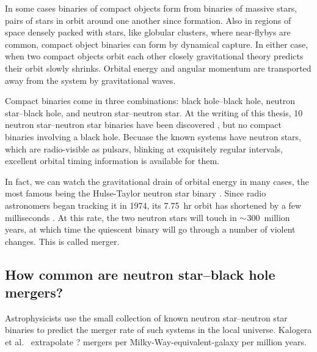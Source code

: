 In some cases binaries of compact objects form from binaries of massive stars,
pairs of stars in orbit around one another since formation. Also in regions of
space densely packed with stars, like globular clusters, where near-flybys are
common, compact object binaries can form by dynamical capture.
In either case, when two compact objects orbit each other closely gravitational
theory predicts their orbit slowly shrinks. Orbital energy and angular momentum
are transported away from the system by gravitational waves.

Compact binaries come in three combinations: black hole--black hole, neutron
star--black hole, and neutron star--neutron star. At the writing of this thesis,
10 neutron star--neutron star binaries have been discovered
\citep{post2014-evolution_compact_binaries},
but no compact binaries involving a black hole.
Becuase the known systems have neutron stars, which are radio-visible as
pulsars, blinking at exquisitely regular intervals, excellent orbital timing
information is available for them.

In fact, we can watch the gravitational drain of orbital energy in many
cases, the most famous being the Hulse-Taylor neutron star binary
\citep{huls1975-discovery}.
Since radio astronomers began tracking it in 1974, its 7.75~hr orbit has
shortened by a few milliseconds \citep{weis2010-hulse_taylor_timing}.
At this rate, the two neutron stars will touch in $\mathord{\sim}$300~million years,
at which time the quiescent binary will go through a number of violent changes.
This is called merger.

\subsection{How common are neutron star--black hole mergers?}

Astrophysicists use the small collection of known neutron star--neutron star
binaries to predict the merger rate of such systems in the local universe.
Kalogera et al.\ \citeyearpar{kalo2004-bns_merger_rate, kalo2004-erratum}
extrapolate ? mergers per Milky-Way-equivalent-galaxy per million years.

